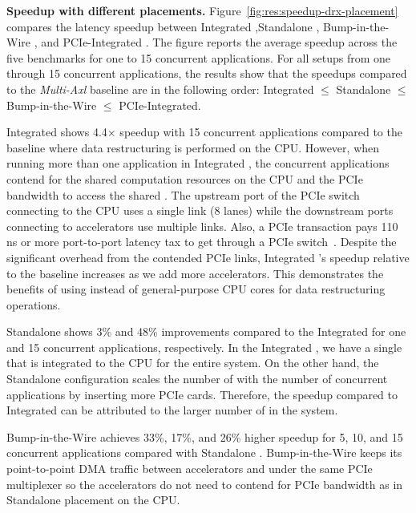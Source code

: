 %
\noindent \textbf{Speedup with different \drx placements.}
%
Figure~\ref{fig:res:speedup-drx-placement} compares the latency speedup between Integrated \drx,Standalone \drx, Bump-in-the-Wire \drx, and PCIe-Integrated \drx.
%
The figure reports the average speedup across the five benchmarks for one to 15 concurrent applications.
%
For all setups from one through 15 concurrent applications, the results show that the speedups compared to the \emph{Multi-Axl} baseline are in the following order: Integrated $\leq$ Standalone $\leq$ Bump-in-the-Wire $\leq$ PCIe-Integrated. 

%
Integrated \drx shows 4.4$\times$ speedup with 15 concurrent applications compared to the baseline where data restructuring is performed on the CPU.
%
However, when running more than one application in Integrated \drx, the concurrent applications contend for the shared \drx computation resources on the CPU and the PCIe bandwidth to access the shared \drx. 
%
The upstream port of the PCIe switch connecting to the CPU uses a single link (8 lanes) while the downstream ports connecting to accelerators use multiple links.
%
Also, a PCIe transaction pays 110 ns or more port-to-port latency tax to get through a PCIe switch~\cite{broadcom:pcie-switches}. 
%
Despite the significant overhead from the contended PCIe links, Integrated \drx's speedup relative to the baseline increases as we add more accelerators.
%
This demonstrates the benefits of using \drx instead of general-purpose CPU cores for data restructuring operations.

%
Standalone \drx shows 3\% and 48\% improvements compared to the Integrated for one and 15 concurrent applications, respectively.
%
In the Integrated \drx, we have a single \drx that is integrated to the CPU for the entire system.
%
On the other hand, the Standalone configuration scales the number of \drx with the number of concurrent applications by inserting more \drx PCIe cards.
%
Therefore, the speedup compared to Integrated \drx can be attributed to the larger number of \drx in the system.

%
Bump-in-the-Wire \drx achieves 33\%, 17\%, and 26\% higher speedup for 5, 10, and 15 concurrent applications compared with Standalone \drx.
%
Bump-in-the-Wire \drx keeps its point-to-point DMA traffic between accelerators and \drx under the same PCIe multiplexer so the accelerators do not need to contend for PCIe bandwidth as in Standalone \drx placement on the CPU.
%

